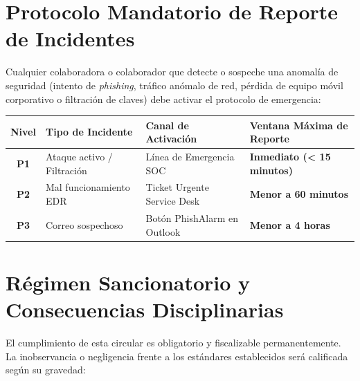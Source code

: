 \documentclass[11pt,letterpaper]{article}
\begin{document}
\section{Protocolo Mandatorio de Reporte de Incidentes}

Cualquier colaboradora o colaborador que detecte o sospeche una anomal\'ia de seguridad (intento de \textit{phishing}, tr\'afico an\'omalo de red, p\'erdida de equipo m\'ovil corporativo o filtraci\'on de claves) debe activar el protocolo de emergencia:

\vspace{0.4em}

\begin{center}
\begin{tabularx}{\linewidth}{@{}c p{3.6cm} p{4.0cm} X@{}}
  \toprule
  \textbf{\color{corpPrimary}Nivel} & \textbf{\color{corpPrimary}Tipo de Incidente} & \textbf{\color{corpPrimary}Canal de Activaci\'on} & \textbf{\color{corpPrimary}Ventana M\'axima de Reporte} \\
  \midrule
  \textbf{\color{corpDanger}P1} & Ataque activo / Filtraci\'on & L\'inea de Emergencia SOC & \textbf{Inmediato (< 15 minutos)} \\
  \addlinespace[2pt]
  \textbf{\color{corpWarning}P2} & Mal funcionamiento EDR & Ticket Urgente Service Desk & \textbf{Menor a 60 minutos} \\
  \addlinespace[2pt]
  \textbf{P3} & Correo sospechoso & Bot\'on PhishAlarm en Outlook & \textbf{Menor a 4 horas} \\
  \bottomrule
\end{tabularx}
\end{center}

\newpage

\section{R\'egimen Sancionatorio y Consecuencias Disciplinarias}

El cumplimiento de esta circular es obligatorio y fiscalizable permanentemente. La inobservancia o negligencia frente a los est\'andares establecidos ser\'a calificada seg\'un su gravedad:

\vspace{0.3em}
\end{document}
